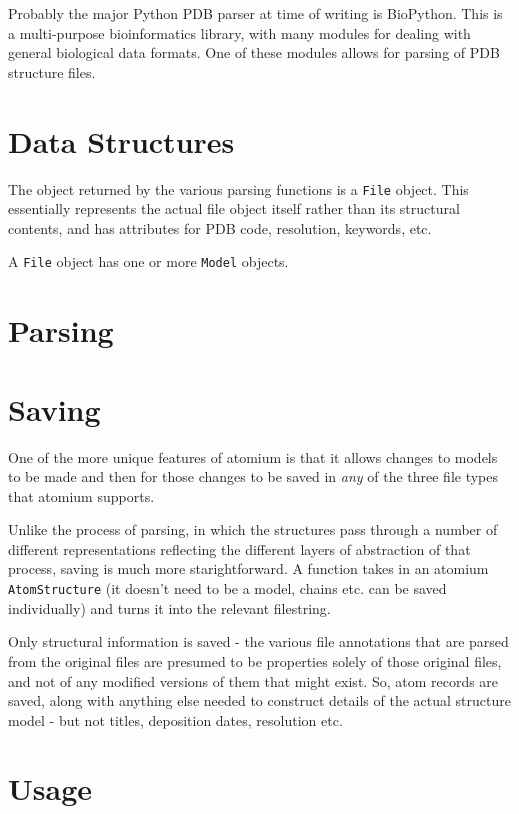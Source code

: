 Probably the major Python PDB parser at time of writing is BioPython. This is a multi-purpose bioinformatics library, with many modules for dealing with general biological data formats. One of these modules allows for parsing of PDB structure files.

\section{Data Structures}

The object returned by the various parsing functions is a \texttt{File} object. This essentially represents the actual file object itself rather than its structural contents, and has attributes for PDB code, resolution, keywords, etc.

A \texttt{File} object has one or more \texttt{Model} objects.

\section{Parsing}

\section{Saving}

One of the more unique features of atomium is that it allows changes to models to be made and then for those changes to be saved in \emph{any} of the three file types that atomium supports.

Unlike the process of parsing, in which the structures pass through a number of different representations reflecting the different layers of abstraction of that process, saving is much more starightforward. A function takes in an atomium \texttt{AtomStructure} (it doesn't need to be a model, chains etc. can be saved individually) and turns it into the relevant filestring.

Only structural information is saved - the various file annotations that are parsed from the original files are presumed to be properties solely of those original files, and not of any modified versions of them that might exist. So, atom records are saved, along with anything else needed to construct details of the actual structure model - but not titles, deposition dates, resolution etc.

\section{Usage}

